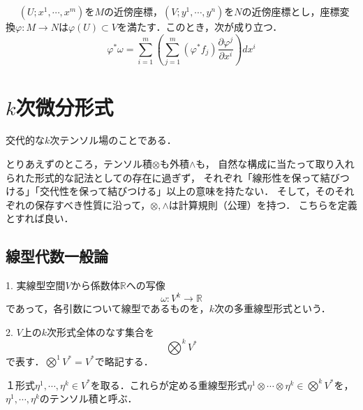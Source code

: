 \documentclass[uplatex, dvipdfmx]{jsreport}
\begin{document}
\begin{proposition}[pullbackの局所座標表示]　
    $(U;x^1,\cdots,x^m)$を$M$の近傍座標，$(V;y^1,\cdots,y^n)$を$N$の近傍座標とし，座標変換$\varphi:M\to N$は$\varphi(U)\subset V$を満たす．このとき，次が成り立つ．
    \[ \varphi^*\omega=\sum^m_{i=1}\left(\sum^m_{j=1}(\varphi^*f_j)\frac{\partial\varphi^j}{\partial x^i}\right)dx^i \]
\end{proposition}

\chapter{$k$次微分形式}

交代的な$k$次テンソル場のことである．

とりあえずのところ，テンソル積$\otimes$も外積$\wedge$も，
自然な構成に当たって取り入れられた形式的な記法としての存在に過ぎず，
それぞれ「線形性を保って結びつける」「交代性を保って結びつける」以上の意味を持たない．
そして，そのそれぞれの保存すべき性質に沿って，$\otimes,\wedge$は計算規則（公理）を持つ．
こちらを定義とすれば良い．

\section{線型代数一般論}

\begin{definition}
    1. 実線型空間$V$から係数体$\mathbb{R}$への写像
    \[ \omega:V^k\to\mathbb{R} \]
    であって，各引数について線型であるものを，$k$次の多重線型形式という．

    2. $V$上の$k$次形式全体のなす集合を
    \[ \bigotimes^kV^* \]
    で表す．$\bigotimes^1V^*=V^*$で略記する．
\end{definition}
\begin{example}[１次形式からの多重線型形式の構成]
    １形式$\eta^1,\cdots,\eta^k\in V^*$を取る．これらが定める重線型形式$\eta^1\otimes\cdots\otimes\eta^k\in\bigotimes^kV^*$を，$\eta^1,\cdots,\eta^k$のテンソル積と呼ぶ．
    \begin{center}
    \end{center}
\end{example}
\end{document}

